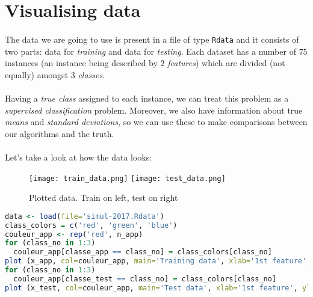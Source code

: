 \section{Visualising data}
\paragraph{}
The data we are going to use is present in a file of type \lstinline{Rdata} and it consists of two parts: data for \emph{training} and data for \emph{testing}.
Each dataset has a number of $75$ instances (an instance being described by $2$ \emph{features}) which are divided (not equally) amongst $3$ \emph{classes}.

\paragraph{}
Having a \emph{true class} assigned to each instance, we can treat this problem as a \emph{supervised classification} problem.
Moreover, we also have information about true \emph{means} and \emph{standard deviations}, so we can use these to make comparisons between our algorithms and the truth.

\paragraph{}
Let's take a look at how the data looks:

\begin{figure}[H]
    \centering
    \texttt{[image: train\_data.png]}
    \texttt{[image: test\_data.png]}
    \caption{Plotted data. Train on left, test on right}
    \label{data}
\end{figure}

\begin{lstlisting}[language=R, caption=Loading and visualising data]
data <- load(file='simul-2017.Rdata')
class_colors = c('red', 'green', 'blue')
couleur_app <- rep('red', n_app)
for (class_no in 1:3)
  couleur_app[classe_app == class_no] = class_colors[class_no]
plot (x_app, col=couleur_app, main='Training data', xlab='1st feature', ylab='2nd feature')
for (class_no in 1:3)
  couleur_app[classe_test == class_no] = class_colors[class_no]
plot (x_test, col=couleur_app, main='Test data', xlab='1st feature', ylab='2nd feature')
\end{lstlisting}

\clearpage

